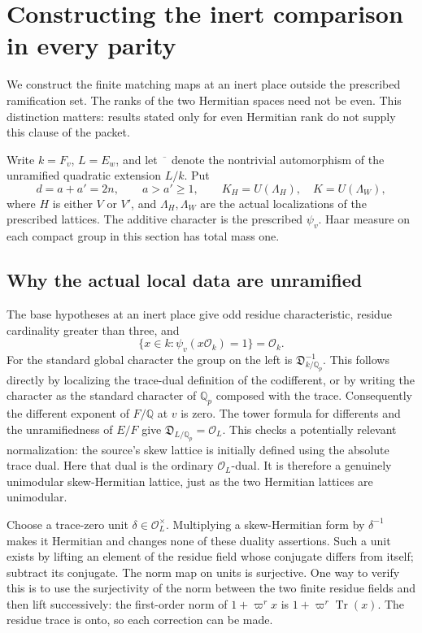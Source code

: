 \section{Constructing the inert comparison in every parity}
\label{sec:sr-inert-matching-construction}

We construct the finite matching maps at an inert place outside
the prescribed ramification set. The ranks of the two Hermitian
spaces need not be even. This distinction matters: results stated
only for even Hermitian rank do not supply this clause of the packet.

Write \(k=F_v\), \(L=E_w\), and let \(\overline{\phantom{x}}\)
denote the nontrivial automorphism of the unramified quadratic
extension \(L/k\). Put
\[
 d=a+a'=2n,\qquad a>a'\ge1,
 \qquad K_H=U(\Lambda_H),\quad K=U(\Lambda_W),
\]
where \(H\) is either \(V\) or \(V'\), and \(\Lambda_H,\Lambda_W\)
are the actual localizations of the prescribed lattices.
The additive character is the prescribed \(\psi_v\).
Haar measure on each compact group in this section has total mass one.

\subsection{Why the actual local data are unramified}
The base hypotheses at an inert place give odd residue characteristic,
residue cardinality greater than three, and
\[
 \{x\in k:\psi_v(x\mathcal O_k)=1\}=\mathcal O_k.
\]
For the standard global character the group on the left is
\(\mathfrak D_{k/\mathbb Q_p}^{-1}\). This follows directly by
localizing the trace-dual definition of the codifferent, or by
writing the character as the standard character of \(\mathbb Q_p\)
composed with the trace. Consequently the different exponent of
\(F/\mathbb Q\) at \(v\) is zero. The tower formula for differents
and the unramifiedness of \(E/F\) give
\(\mathfrak D_{L/\mathbb Q_p}=\mathcal O_L\).
This checks a potentially relevant normalization: the source's
skew lattice is initially defined using the absolute trace dual.
Here that dual is the ordinary \(\mathcal O_L\)-dual.
It is therefore a genuinely unimodular skew-Hermitian lattice,
just as the two Hermitian lattices are unimodular.

Choose a trace-zero unit \(\delta\in\mathcal O_L^\times\).
Multiplying a skew-Hermitian form by \(\delta^{-1}\) makes it
Hermitian and changes none of these duality assertions.
Such a unit exists by lifting an element of the residue field
whose conjugate differs from itself; subtract its conjugate.
The norm map on units is surjective. One way to verify this is
to use the surjectivity of the norm between the two finite
residue fields and then lift successively: the first-order norm
of \(1+\varpi^r x\) is \(1+\varpi^r\operatorname{Tr}(x)\).
The residue trace is onto, so each correction can be made.


